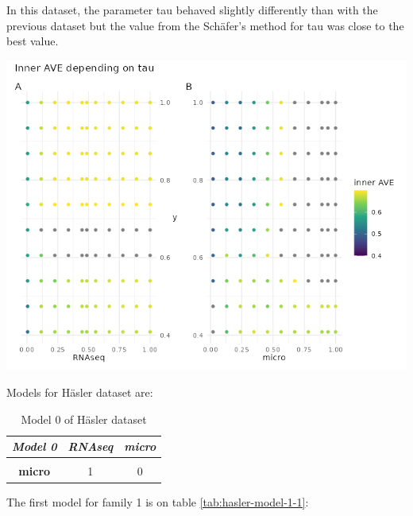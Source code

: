 \documentclass[
  12pt,
  a4paper,
  twoside,
  openright]{book}
\let\origfigure\figure
\let\endorigfigure\endfigure
\renewenvironment{figure}[1][2] {
    \expandafter\origfigure\expandafter[!ht]
} {
    \endorigfigure
}
\begin{document}
In this dataset, the parameter tau behaved slightly differently than with the previous dataset but the value from the Schäfer's method for tau was close to the best value.

\begin{figure}
\includegraphics[width=1\linewidth]{images/hasler-centroid_tau} \caption[Tau effect on inner AVE on Häsler's dataset.]{Changes on tau on the centroid scheme on the Häsler dataset affect the inner AVE score on the model 1. The panel A shows on the ordinate the RNAseq tau value, the panel B on the right, shows the tau of the microorganism; both of them show the y's tau on the abscissa.}\label{fig:hasler-tau}
\end{figure}

Models for Häsler dataset are:

\begin{table}[H]

\caption[Model 0 of Häsler dataset]{\label{tab:hasler-model-0}Model 0 of Häsler dataset}
\centering
\begin{tabular}[t]{|>{}c|c|>{}c|}
\hline
\em{\textbf{Model 0}} & \em{\textbf{RNAseq}} & \em{\textbf{micro}}\\
\hline
\textbf{\cellcolor{gray!6}{RNAseq}} & \cellcolor{gray!6}{0} & \cellcolor{gray!6}{1}\\
\hline
\textbf{micro} & 1 & 0\\
\hline
\end{tabular}
\end{table}

The first model for family 1 is on table \ref{tab:hasler-model-1-1}:
\end{document}

